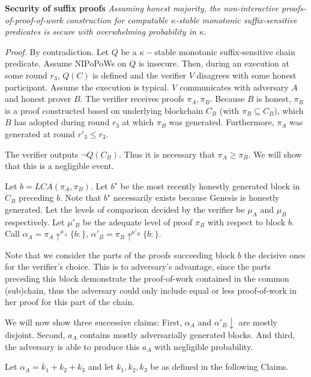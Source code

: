 \begin{thm}{\textbf{Security of suffix proofs}}
	\textit{Assuming honest majority, the non-interactive
	proofs-of-proof-of-work construction for computable $\kappa$-stable monotonic
	suffix-sensitive predicates is secure with overwhelming probability in $\kappa$.}
	\label{thm:original_suffix_security}
\end{thm}
\textit{Proof.} By contradiction. Let $Q$ be a $\kappa-$stable monotonic
suffix-sensitive chain predicate. Assume NIPoPoWs on $Q$ is insecure. Then,
during an execution at some round  $r_3$, $Q(C)$ is defined and the verifier
$V$ disagrees with some honest participant. Assume the execution is typical.
$V$ communicates with adversary $A$ and honest prover $B$. The verifier receives
proofs $\pi_A, \pi_B$. Because $B$ is honest, $\pi_B$ is a proof constructed
based on underlying blockchain $C_B$ (with $\pi_B \subseteq C_B$), which $B$
has adopted during round $r_3$ at which $\pi_B$ was generated. Furthermore,
$\pi_A$ was generated at round $r'_3 \leq r_3$.

The verifier outputs $\neg Q(C_B)$. Thus it is necessary that $\pi_A \geq 
\pi_B$. We will show that this is a negligible event.

Let $b = LCA(\pi_A, \pi_B)$. Let $b^\star$ be the most recently honestly
generated block in $C_B$ preceding $b$. Note that $b^\star$ necessarily
exists because Genesis is honestly generated. Let the levels of comparison
decided by the verifier be $\mu_A$ and $\mu_B$ respectively. Let $\mu'_B$
be the adequate level of proof $\pi_B$  with respect to block $b$. Call
$\alpha_A = \pi_A \uparrow^{\mu_A}\{b:\}$,
$\alpha'_B = \pi_B \uparrow^{\mu'_B}\{b:\}$.

Note that we consider the parts of the proofs succeeding block $b$ the decisive ones 
for the verifier's choice. This is to adversary's advantage, since the parts 
preceding this block demonstrate the proof-of-work contained in the common 
(sub)chain, thus the adversary could only include equal or less proof-of-work
in her proof for this part of the chain.

We will now show three successive claims: First, $\alpha_A$ and $\alpha'_B \downarrow$
are mostly disjoint. Second, $a_A$ contains mostly adversarially generated blocks.
And third, the adversary is able to produce this $a_A$ with negligible probability.

Let $\alpha_A = k_1 + k_2 + k_3$ and let $k_1, k_2, k_3$ be as defined in the
following Claims.

